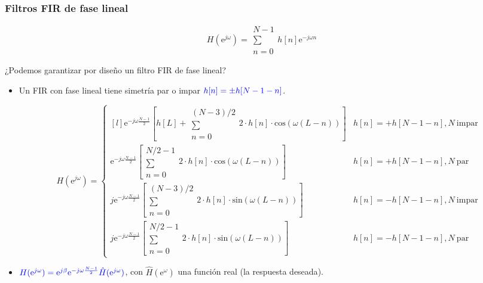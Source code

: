 \documentclass[handout]{beamer}
\numberwithin{section}{part}
\begin{document}
\begin{frame}
  \frametitle{Filtros FIR de fase lineal}
  \[
  H(\mathrm{e}^{j\omega})=\substack{N-1\\\sum\\n=0}h[n]\mathrm{e}^{-j\omega n}
  \]
  \vspace{0.1cm}

  \alert{¿Podemos garantizar por diseño un filtro FIR de fase lineal?}
  
  \begin{itemize}
    \footnotesize
    \item Un FIR con fase lineal tiene simetría par o impar $\color{blue}h[n]=\pm h[N-1-n]$.
    \hspace*{-1.25cm}\begin{minipage}{0.8\textwidth}
      \scriptsize
      \[
        H(\mathrm{e}^{j\omega})=\left\{\begin{matrix*}[l]
        \mathrm{e}^{-j\omega\frac{N-1}{2}}\left[h[L] + \substack{(N-3)/2\\\sum\\n=0}2\cdot h[n]\cdot\mathrm{cos}(\omega(L-n))\right] & h[n]=+h[N-1-n],N~\mathrm{impar} \\[2ex]
        \mathrm{e}^{-j\omega\frac{N-1}{2}}\left[\substack{N/2-1\\\sum\\n=0}2\cdot h[n]\cdot\mathrm{cos}(\omega(L-n))\right] & h[n]=+h[N-1-n],N~\mathrm{par} \\[2ex]
        j\mathrm{e}^{-j\omega\frac{N-1}{2}}\left[\substack{(N-3)/2\\\sum\\n=0}2\cdot h[n]\cdot\mathrm{sin}(\omega(L-n))\right] & h[n]=-h[N-1-n],N~\mathrm{impar} \\[2ex]
        j\mathrm{e}^{-j\omega\frac{N-1}{2}}\left[\substack{N/2-1\\\sum\\n=0}2\cdot h[n]\cdot\mathrm{sin}(\omega(L-n))\right] & h[n]=-h[N-1-n],N~\mathrm{par}
      \end{matrix*}\right.
      \]
    \end{minipage}
    \item $\color{blue}H(\mathrm{e}^{j\omega})=\mathrm{e}^{j\beta}\mathrm{e}^{-j\omega\frac{N-1}{2}}\hat H(\mathrm{e}^{j\omega})$, con $\hat H(\mathrm{e}^{\omega})$ una función real (\alert{la respuesta deseada}).
  \end{itemize}
\end{frame}
\end{document}
